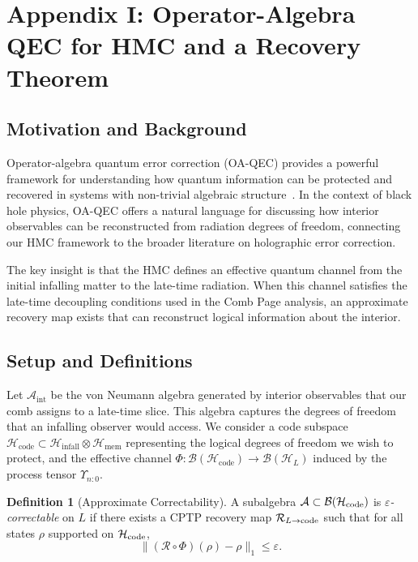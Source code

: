\documentclass[a4paper,11pt]{article}
\newcommand{\HMC}{\textup{\textsc{HMC}}\xspace}
\theoremstyle{plain}
\theoremstyle{definition}
\newtheorem{definition}{Definition}
\theoremstyle{remark}
\begin{document}
\section{Appendix I: Operator-Algebra QEC for \HMC{} and a Recovery Theorem}
\label{app:oa_qec}
\label{app:oaqec}

\subsection{Motivation and Background}
Operator-algebra quantum error correction (OA-QEC) provides a powerful framework for understanding how quantum information can be protected and recovered in systems with non-trivial algebraic structure~\cite{Harlow:2016,Pastawski:2015}. In the context of black hole physics, OA-QEC offers a natural language for discussing how interior observables can be reconstructed from radiation degrees of freedom, connecting our \HMC{} framework to the broader literature on holographic error correction.

The key insight is that the \HMC{} defines an effective quantum channel from the initial infalling matter to the late-time radiation. When this channel satisfies the late-time decoupling conditions used in the Comb Page analysis, an approximate recovery map exists that can reconstruct logical information about the interior.

\subsection{Setup and Definitions}
Let $\mathcal{A}_{\mathrm{int}}$ be the von Neumann algebra generated by interior observables that our comb assigns to a late-time slice. This algebra captures the degrees of freedom that an infalling observer would access. We consider a code subspace $\mathcal{H}_{\mathrm{code}}\subset \mathcal{H}_{\mathrm{infall}}\otimes \mathcal{H}_{\mathrm{mem}}$ representing the logical degrees of freedom we wish to protect, and the effective channel $\Phi:\mathcal{B}(\mathcal{H}_{\mathrm{code}})\to \mathcal{B}(\mathcal{H}_{L})$ induced by the process tensor $\Upsilon_{n{:}0}$.

\begin{definition}[Approximate Correctability]
A subalgebra $\mathcal{A} \subset \mathcal{B}(\mathcal{H}_{\rm code})$ is \emph{$\varepsilon$-correctable} on $L$ if there exists a CPTP recovery map $\mathcal{R}_{L\to \rm code}$ such that for all states $\rho$ supported on $\mathcal{H}_{\rm code}$,
\[
\|(\mathcal{R} \circ \Phi)(\rho) - \rho\|_1 \leq \varepsilon.
\]
\end{definition}
\end{document}
